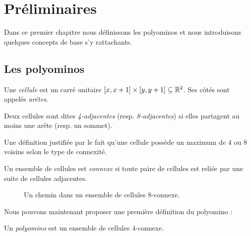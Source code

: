 \chapter{Préliminaires}

Dans ce premier chapitre nous définissons les polyominos et nous introduisons quelques concepts de base s'y rattachants.

\section{Les polyominos}

\begin{definition}
Une \emph{cellule} est un carré unitaire $[x,x+1] \times [y,y+1] \subseteq \mathbb{R}^2$. Ses côtés sont appelés \emph{arêtes}.
\end{definition}

\begin{definition*}
Deux cellules sont dites \emph{4-adjacentes} (resp. \emph{8-adjacentes}) si elles partagent au moins une arête (resp. un sommet).
\end{definition*}

Une définition justifiée par le fait qu'une cellule possède un maximum de $4$ ou $8$ voisins selon le type de connexité.

\begin{definition*}
Un ensemble de cellules est \emph{connexe} si toute paire de cellules est reliée par une suite de cellules adjacentes.
\end{definition*}

\begin{figure}[h]
\centering
{}
\caption[Un chemin]{Un chemin dans un ensemble de cellules $8$-connexe.}
\end{figure}

Nous pouvons maintenant proposer une première définition du polyomino :

\begin{definition}
Un \emph{polyomino} est un ensemble de cellules $4$-connexe.
\end{definition}

